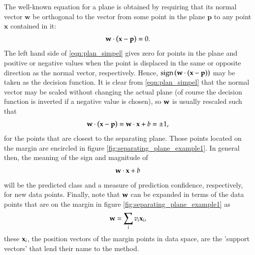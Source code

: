 The well-known equation for a plane is obtained by requiring that its normal vector $\mathbf{w}$ be orthogonal to the vector from some point in the plane $\mathbf{p}$ to any point $\mathbf{x}$ contained in it:
\begin{equation}
	\mathbf{w}\cdot\left( \mathbf{x} - \mathbf{p} \right) = 0. \label{eqn:plan_simpel}
\end{equation}
The left hand side of \eqref{eqn:plan_simpel} gives zero for points in the plane and positive or negative values when the point is displaced in the same or opposite direction as the normal vector, respectively. Hence,  $\text{sign}\left( \mathbf{w}\cdot\left( \mathbf{x} - \mathbf{p} \right) \right)$ may be taken as the decision function. It is clear from \eqref{eqn:plan_simpel} that the normal vector may be scaled without changing the actual plane (of course the decision function is inverted if a negative value is chosen), so $\mathbf{w}$ is usually rescaled such that
\begin{equation}
	\mathbf{w}\cdot\left( \mathbf{x} - \mathbf{p} \right) = \mathbf{w}\cdot \mathbf{x} + b = \pm 1, \label{eqn:rescaled_normal_vector}
\end{equation}
for the points that are closest to the separating plane. Those points located on the margin are encircled in figure \ref{fig:separating_plane_example1}. In general then, the meaning of the sign and magnitude of
\begin{equation}
	\mathbf{w}\cdot \mathbf{x} + b  \label{eqn:classification_decision_function}
\end{equation}
will be the predicted class and a measure of prediction confidence, respectively, for new data points. Finally, note that $\mathbf{w}$ can be expanded in terms of the data points that are on the margin in figure \ref{fig:separating_plane_example1} as
\begin{equation}
	\mathbf{w} = \sum_i v_i \mathbf{x}_i,
\end{equation}
these $\mathbf{x}_i$, the position vectors of the margin points in data space, are the 'support vectors' that lend their name to the method.

